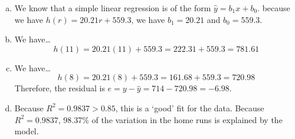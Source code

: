 \documentclass[11pt,letterpaper]{article}
\begin{document}
\sol 
\begin{enumerate}[(a)]
\item We know that a simple linear regression is of the form $\widehat{y}= b_1 x + b_0$. because we have $h(r)= 20.21r + 559.3$, we have $b_1= 20.21$ and $b_0= 559.3$. \pspace

\item We have\dots
	\[
	h(11)= 20.21(11) + 559.3= 222.31 + 559.3= 781.61
	\] \pspace

\item We have\dots
	\[
	h(8)= 20.21(8) + 559.3= 161.68 + 559.3= 720.98
	\]
Therefore, the residual is $e= y - \widehat{y}= 714 - 720.98= -6.98$. \pspace

\item Because $R^2= 0.9837 > 0.85$, this is a `good' fit for the data. Because $R^2= 0.9837$, 98.37\% of the variation in the home runs is explained by the model. 
\end{enumerate}
\end{document}
